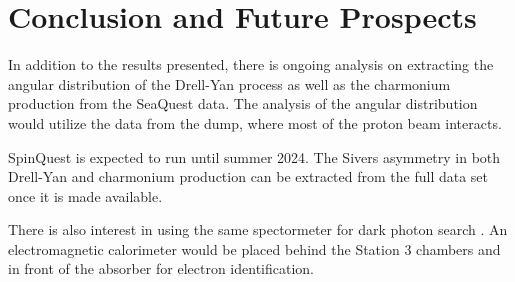 \documentclass[../main.tex]{subfiles}
\begin{document}
\ifSubfilesClassLoaded{
	\mainmatter
	\setcounter{chapter}{5}
}{}

\chapter{Conclusion and Future Prospects}
\label{ch:conclusion}

In addition to the results presented, there is ongoing analysis on extracting 
the angular distribution of the Drell-Yan process as well as the charmonium 
production from the SeaQuest data. The analysis of the angular distribution would 
utilize the data from the dump, where most of the proton beam interacts.


SpinQuest is expected to run until summer 2024. The Sivers
asymmetry in both Drell-Yan and charmonium production can be extracted from the full
data set once it is made available.

There is also interest in using the same spectormeter for dark photon search
\cite{apyan2022}. An electromagnetic calorimeter would be placed behind the 
Station 3 chambers and in front of the absorber for electron identification.

\ifSubfilesClassLoaded{ \printbibliography[heading=bibintoc,title={References}]}{}
\end{document}
